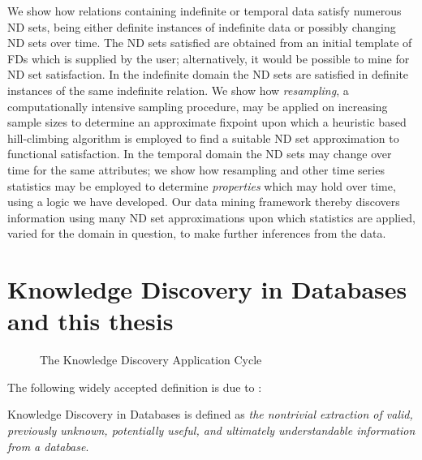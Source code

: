 \smallskip
We show how relations containing indefinite or temporal data satisfy
numerous ND sets, being either definite instances of indefinite data
or possibly changing ND sets over time. The ND sets satisfied are
obtained from an initial template of FDs which is supplied by the
user; alternatively, it would be possible to mine for ND set
satisfaction. In the indefinite
domain the ND sets are satisfied in definite instances of the same indefinite
relation. We show how {\em resampling}, a computationally
intensive sampling procedure, may be applied on increasing sample
sizes to determine an approximate fixpoint upon which a heuristic based
hill-climbing algorithm is employed to find a suitable ND set
approximation to functional satisfaction. 
In the temporal domain the ND sets may change over time
for the same attributes; we
show how resampling and other time series statistics may be employed
to determine {\em properties} which may hold over time, using a logic
we have developed. Our data
mining framework thereby discovers information using many ND set
approximations upon which statistics are applied, varied for the
domain in question, to make further inferences from the data.

\section{Knowledge Discovery in Databases and this thesis}\label{sec:int_kdd}

 
\begin{figure}
\centerline{}
\caption{\label{fig:kd_process}The Knowledge Discovery
Application Cycle}
\end{figure}

The following widely accepted definition is due to \cite{kdd96}:

\begin{definition}
\begin{rm} Knowledge Discovery in Databases is defined as {\em the
nontrivial extraction of valid, previously unknown, potentially
useful, and ultimately understandable information from a database}.    
\end{rm}
\end{definition}

